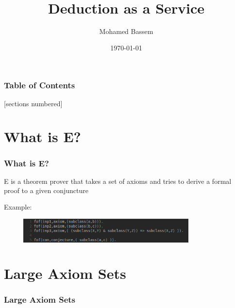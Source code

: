 \documentclass[10pt]{beamer}
\title{Deduction as a Service}
\subtitle{}
\date{\today}
\author{Mohamed Bassem}
\institute{German University in Cairo}
\begin{document}
\maketitle

\begin{frame}
  \frametitle{Table of Contents}
  [sections numbered]
  \tableofcontents[
    hideallsubsections,
  ]
\end{frame}

\section{What is E?}
\begin{frame}[fragile]
  \frametitle{What is E?}

  E is a theorem prover that takes a set of axioms and tries to derive a formal proof to a given conjuncture

  \pause{}
  Example:
  \begin{figure}
    \includegraphics[width=90mm]{imgs/SampleAxioms.png}
  \end{figure}
\end{frame}


\section{Large Axiom Sets}
\begin{frame}[fragile]
  \frametitle{Large Axiom Sets}
\end{frame}
\end{document}
